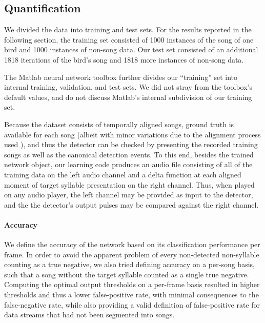 \documentclass[10pt,letterpaper]{article}
\renewcommand{\subsubsection}[1]{\paragraph{#1}}
\begin{document}
\subsection{Quantification}
\label{sec:quantify}

We divided the data into training and test sets.  For the results reported in the following section, the training set consisted of 1000 instances of the song of one bird and 1000 instances of non-song data.  Our test set consisted of an additional 1818 iterations of the bird's song and 1818 more instances of non-song data.

The Matlab neural network toolbox further divides our ``training'' set into internal training, validation, and test sets.  We did not stray from the toolbox's default values, and do not discuss Matlab's internal subdivision of our training set. %

Because the dataset consists of temporally aligned songs, ground truth is available for each song (albeit with minor variations due to the alignment process used \cite{Poole2012}), and thus the detector can be checked by
presenting the recorded training songs as well as the canonical
detection events. To this end, besides the trained network object, our
learning code produces an audio file consisting of all of the training
data on the left audio channel and a delta function at each aligned moment of
target syllable presentation on the right channel. Thus, when
played on any audio player, the left channel may be provided as input
to the detector, and the the detector's output pulses may be compared against the right channel.


\subsubsection{Accuracy}
\label{sec:accuracy}

We define the accuracy of the network based on its classification performance per frame. In order to avoid the apparent problem of every non-detected non-syllable counting as a true negative, we also tried defining accuracy on a per-song basis, such that a song without the target syllable counted as a single true negative.  Computing the optimal output thresholds on a per-frame basis resulted in higher thresholds and thus a lower false-positive rate, with minimal consequences to the false-negative rate, while also providing a valid definition of false-positive rate for data streams that had not been segmented into songs.
\end{document}
